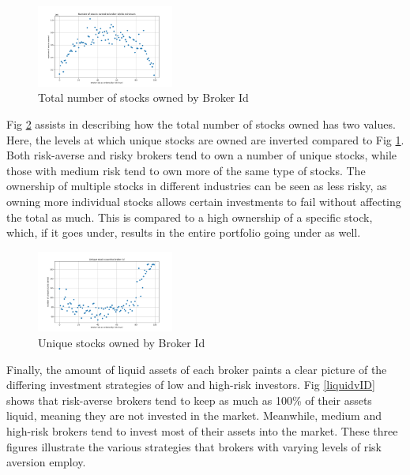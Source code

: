 \documentclass[letterpaper, 10 pt, proceedings]{ieeetran}
\begin{document}
	\begin{figure}[h]
		\centering
		\twocolumn
		\includegraphics[width=0.4\textwidth]{stocksOwnedToBrokerIds.png}
		\caption{Total number of stocks owned by Broker Id}
		\label{totalvID}
	\end{figure}
	\FloatBarrier

	Fig \ref{uniquevID} assists in describing how the total number of stocks owned has two values. Here, the levels at which unique stocks are owned are inverted compared to Fig \ref{totalvID}. Both risk-averse and risky brokers tend to own a number of unique stocks, while those with medium risk tend to own more of the same type of stocks. The ownership of multiple stocks in different industries can be seen as less risky, as owning more individual stocks allows certain investments to fail without affecting the total as much. This is compared to a high ownership of a specific stock, which, if it goes under, results in the entire portfolio going under as well. 

	\begin{figure}[h]
		\centering
		\includegraphics[width=0.4\textwidth]{uniqueStockCountToBrokerIds.png}
		\caption{Unique stocks owned by Broker Id}
		\label{uniquevID}
	\end{figure}
	\FloatBarrier

	Finally, the amount of liquid assets of each broker paints a clear picture of the differing investment strategies of low and high-risk investors. Fig \ref{liquidvID} shows that risk-averse brokers tend to keep as much as 100\% of their assets liquid, meaning they are not invested in the market. Meanwhile, medium and high-risk brokers tend to invest most of their assets into the market. These three figures illustrate the various strategies that brokers with varying levels of risk aversion employ.
\end{document}
